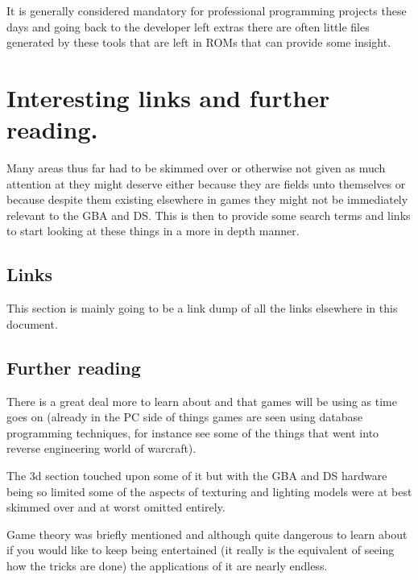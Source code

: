 \documentclass[
]{book}
\begin{document}
It is generally considered mandatory for professional programming projects these days and going back to the developer left extras there are often little files generated by these tools that are left in ROMs that can provide some insight.

\hypertarget{interesting-links-and-further-reading.}{%
\chapter{Interesting links and further reading.}\label{interesting-links-and-further-reading.}}

Many areas thus far had to be skimmed over or otherwise not given as much attention at they might deserve either because they are fields unto themselves or because despite them existing elsewhere in games they might not be immediately relevant to the GBA and DS. This is then to provide some search terms and links to start looking at these things in a more in depth manner.

\hypertarget{links}{%
\section{Links}\label{links}}

This section is mainly going to be a link dump of all the links elsewhere in this document.

\hypertarget{further-reading}{%
\section{Further reading}\label{further-reading}}

There is a great deal more to learn about and that games will be using as time goes on (already in the PC side of things games are seen using database programming techniques, for instance see some of the things that went into reverse engineering world of warcraft).

The 3d section touched upon some of it but with the GBA and DS hardware being so limited some of the aspects of texturing and lighting models were at best skimmed over and at worst omitted entirely.

Game theory was briefly mentioned and although quite dangerous to learn about if you would like to keep being entertained (it really is the equivalent of seeing how the tricks are done) the applications of it are nearly endless.
\end{document}
